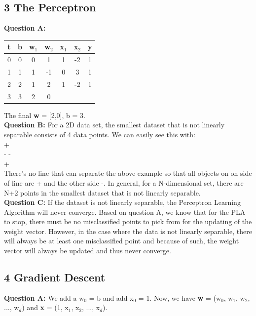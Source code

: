 \documentclass[12 pt]{article}
\begin{document}
	\subsection*{3 The Perceptron}
	\noindent\textbf{Question A:}
	\begin{center}
		\begin{tabular}{ |c|c|c|c|c|c|c| } 
			\hline
			t & b & w$_1$ & w$_2$  & x$_1$ &  x$_2$ & y \\ 
			\hline
			0 & 0 & 0 & 1 & 1 & -2 & 1\\ 
			1 & 1 & 1 & -1 & 0 & 3 & 1\\
			2 & 2 & 1 & 2 & 1 & -2 & 1\\
			3 & 3 & 2 & 0 & & &  \\
			\hline
		\end{tabular}
	\end{center}
	\noindent The final \textbf{w} = [2,0], b = 3. \\
	
	\noindent\textbf{Question B:} For a 2D data set, the smallest dataset that is not linearly separable consists of 4 data points. We can easily see this with: \\
	\indent +\\
	- \space\space\space\space\space\space\space\space\space -\\
	\indent +\\
	There's no line that can separate the above example so that all objects on on side of line are + and the other side -. In general, for a N-dimensional set, there are N+2 points in the smallest dataset that is not linearly separable. \\
	
	\noindent\textbf{Question C:} If the dataset is not linearly separable, the Perceptron Learning Algorithm will never converge. Based on question A, we know that for the PLA to stop, there must be no misclassified points to pick from for the updating of the weight vector. However, in the case where the data is not linearly separable, there will always be at least one misclassified point and because of such, the weight vector will always be updated and thus never converge.
	
	
	
	\subsection*{4 Gradient Descent}
	\noindent\textbf{Question A:} We add a w$_0$ = b and add x$_0$ = 1. Now, we have \textbf{w} = (w$_0$, w$_1$, w$_2$, ..., w$_d$) and \textbf{x} = (1, x$_1$, x$_2$, ..., x$_d$).\\
	
\end{document}
